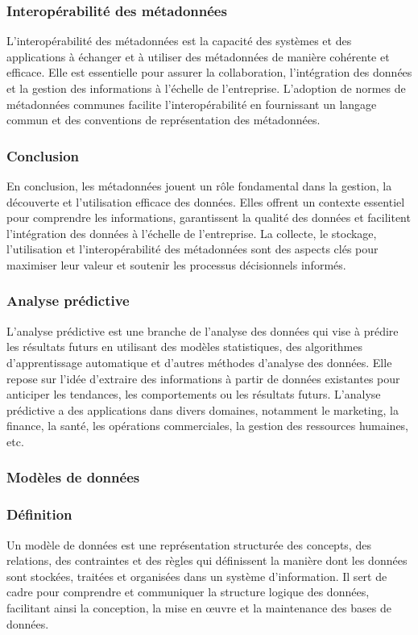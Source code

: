 \documentclass{article}
\begin{document}
	\subsubsection{Interopérabilité des métadonnées}
	L’interopérabilité des métadonnées est la capacité des systèmes et des applications à échanger et à utiliser des métadonnées de manière cohérente et efficace. Elle est essentielle pour assurer la collaboration, l’intégration des données et la gestion des informations à l’échelle de l’entreprise. L’adoption de normes de métadonnées communes facilite l’interopérabilité en fournissant un langage commun et des conventions de représentation des métadonnées.
	
	\subsubsection{Conclusion}
	En conclusion, les métadonnées jouent un rôle fondamental dans la gestion, la découverte et l’utilisation efficace des données. Elles offrent un contexte essentiel pour comprendre les informations, garantissent la qualité des données et facilitent l’intégration des données à l’échelle de l’entreprise. La collecte, le stockage, l’utilisation et l’interopérabilité des métadonnées sont des aspects clés pour maximiser leur valeur et soutenir les processus décisionnels informés.
	
	\subsubsection{Analyse prédictive}
	L’analyse prédictive est une branche de l’analyse des données qui vise à prédire les résultats futurs en utilisant des modèles statistiques, des algorithmes d’apprentissage automatique et d’autres méthodes d’analyse des données. Elle repose sur l’idée d’extraire des informations à partir de données existantes pour anticiper les tendances, les comportements ou les résultats futurs. L’analyse prédictive a des applications dans divers domaines, notamment le marketing, la finance, la santé, les opérations commerciales, la gestion des ressources humaines, etc.
	
	\subsubsection{Modèles de données}
	\subsubsection{Définition}
	Un modèle de données est une représentation structurée des concepts, des relations, des contraintes et des règles qui définissent la manière dont les données sont stockées, traitées et organisées dans un système d’information. Il sert de cadre pour comprendre et communiquer la structure logique des données, facilitant ainsi la conception, la mise en œuvre et la maintenance des bases de données.
	
\end{document}
